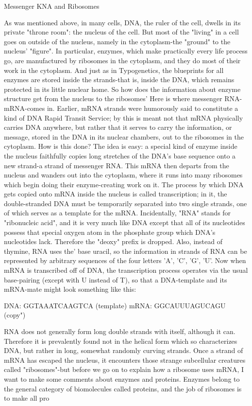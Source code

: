 {                              Messenger KNA and Ribosomes

As was mentioned above, in many cells, DNA, the ruler of the cell, dwells in its private
"throne room": the nucleus of the cell. But most of the "living" in a cell goes on outside of
the nucleus, namely in the cytoplasm-the "ground" to the nucleus' "figure". In particular,
enzymes, which make practically every life process go, are manufactured by ribosomes in the
cytoplasm, and they do most of their work in the cytoplasm. And just as in Typogenetics, the
blueprints for all enzymes are stored inside the strands-that is, inside the DNA, which
remains protected in its little nuclear home. So how does the information about enzyme
structure get from the nucleus to the ribosomes'
         Here is where messenger RNA-mRNA-comes in. Earlier, mRNA strands were
humorously said to constitute a kind of DNA Rapid Transit Service; by this is meant not that
mRNA physically carries DNA anywhere, but rather that it serves to carry the information, or
message, stored in the DNA in its nuclear chambers, out to the ribosomes in the cytoplasm.
How is this done? The idea is easy: a special kind of enzyme inside the nucleus faithfully
copies long stretches of the DNA's base sequence onto a new strand-a strand of messenger
RNA. This mRNA then departs from the nucleus and wanders out into the cytoplasm, where
it runs into many ribosomes which begin doing their enzyme-creating work on it.
    The process by which DNA gets copied onto mRNA inside the nucleus is called
transcription; in it, the double-stranded DNA must be temporarily separated into two single
strands, one of which serves as a template for the mRNA. Incidentally, "RNA" stands for
"ribonucleic acid", and it is very much like DNA except that all of its nucleotides possess that
special oxygen atom in the phosphate group which DNA's nucleotides lack. Therefore the
"deoxy" prefix is dropped. Also, instead of thymine, RNA uses the' base uracil, so the
information in strands of RNA can be represented by arbitrary sequences of the four letters
'A', 'C', 'G', 'U'. Now when mRNA is transcribed off of DNA, the transcription process
operates via the usual base-pairing (except with U instead of T), so that a DNA-template and
its mRNA-mate might look something like this:

DNA:             GGTAAATCAAGTCA                        (template)
mRNA:            GGCAUUUAGUCAGU                        (copy")

RNA does not generally form long double strands with itself, although it can. Therefore it is
prevalently found not in the helical form which so characterizes DNA, but rather in long,
somewhat randomly curving strands.
        Once a strand of mRNA has escaped the nucleus, it encounters those strange
subcellular creatures called "ribosomes"-but before we go on to explain how a ribosome uses
mRNA, I want to make some comments about enzymes and proteins. Enzymes belong to the
general category of biomolecules called proteins, and the job of ribosomes is to make all pro




}
